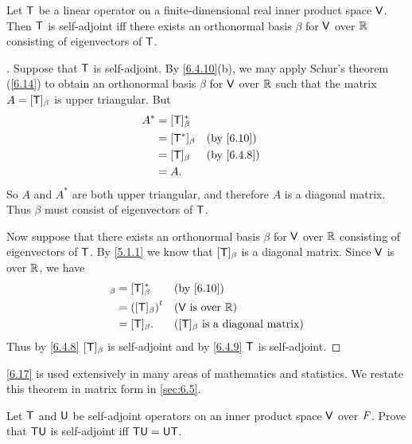 \begin{thm}\label{6.17}
	Let \(\mathsf{T}\) be a linear operator on a finite-dimensional real inner product space \(\mathsf{V}\).
	Then \(\mathsf{T}\) is self-adjoint iff there exists an orthonormal basis \(\beta\) for \(\mathsf{V}\) over \(\mathbb{R}\) consisting of eigenvectors of \(\mathsf{T}\).
\end{thm}

\begin{proof}[]
	Suppose that \(\mathsf{T}\) is self-adjoint.
	By \cref{6.4.10}(b), we may apply Schur's theorem (\cref{6.14}) to obtain an orthonormal basis \(\beta\) for \(\mathsf{V}\) over \(\mathbb{R}\) such that the matrix \(A = [\mathsf{T}]_{\beta}\) is upper triangular.
	But
	\begin{align*}
		A^* & = [\T]_{\beta}^*                 \\
		    & = [\T^*]_{\beta} &  & \by{6.10}  \\
		    & = [\T]_{\beta}   &  & \by{6.4.8} \\
		    & = A.
	\end{align*}
	So \(A\) and \(A^*\) are both upper triangular, and therefore \(A\) is a diagonal matrix.
	Thus \(\beta\) must consist of eigenvectors of \(\mathsf{T}\).

	Now suppose that there exists an orthonormal basis \(\beta\) for \(\mathsf{V}\) over \(\mathbb{R}\) consisting of eigenvectors of \(\mathsf{T}\).
	By \cref{5.1.1} we know that \([\mathsf{T}]_{\beta}\) is a diagonal matrix.
	Since \(\mathsf{V}\) is over \(\mathbb{R}\), we have
	\begin{align*}
		[\T^*]_{\beta} & = [\T]_{\beta}^*      &  & \by{6.10}                                      \\
		               & = \tp{([\T]_{\beta})} &  & \text{(\(\V\) is over \(\R\))}                 \\
		               & = [\T]_{\beta}.       &  & \text{(\([\T]_{\beta}\) is a diagonal matrix)}
	\end{align*}
	Thus by \cref{6.4.8} \([\mathsf{T}]_{\beta}\) is self-adjoint and by \cref{6.4.9} \(\mathsf{T}\) is self-adjoint.
\end{proof}

\begin{note}
	\cref{6.17} is used extensively in many areas of mathematics and statistics.
	We restate this theorem in matrix form in \cref{sec:6.5}.
\end{note}

\exercisesection

\setcounter{ex}{3}
\begin{ex}\label{ex:6.4.4}
	Let \(\mathsf{T}\) and \(\mathsf{U}\) be self-adjoint operators on an inner product space \(\mathsf{V}\) over \(\mathit{F}\).
	Prove that \(\mathsf{T} \mathsf{U}\) is self-adjoint iff \(\mathsf{T} \mathsf{U} = \mathsf{U} \mathsf{T}\).
\end{ex}

